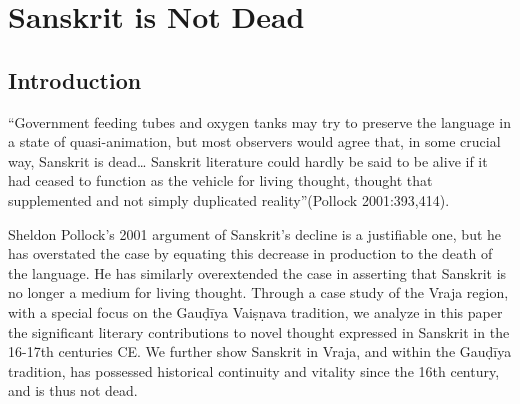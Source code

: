 \chapter{Sanskrit is Not Dead}\label{chapter5}


\section*{Introduction}

\begin{myquote}
\eleven
“Government feeding tubes and oxygen tanks may try to preserve the language in a state of quasi-animation, but most observers would agree that, in some crucial way, Sanskrit is dead… Sanskrit literature could hardly be said to be alive if it had ceased to function as the vehicle for living thought, thought that supplemented and not simply duplicated reality”\hfill(Pollock 2001:393,414).
\end{myquote}

Sheldon Pollock’s 2001 argument of Sanskrit’s decline is a justifiable one, but he has overstated the case by equating this decrease in production to the death of the language. He has similarly overextended the case in asserting that Sanskrit is no longer a medium for living thought. Through a case study of the Vraja region, with a special focus on the Gauḍīya Vaiṣṇava tradition, we analyze in this paper the significant literary contributions to novel thought expressed in Sanskrit in the 16-17th centuries CE\@. We further show Sanskrit in Vraja, and within the Gauḍīya tradition, has possessed historical continuity and vitality since the 16th century, and is thus not dead.
\vskip 2pt

